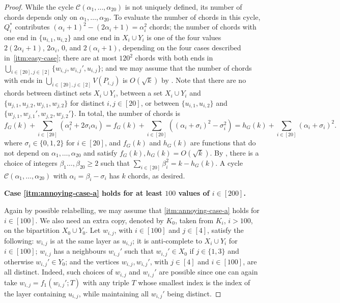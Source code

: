 \documentclass[11pt,english]{article}
\theoremstyle{plain}
\theoremstyle{definition}
\theoremstyle{remark}
\newcommand{\C}{\mathcal{C}}
\begin{document}
\begin{proof}
        While the cycle $\C(\alpha_1, \ldots, \alpha_{20})$ is not uniquely defined, its number of chords depends only on $\alpha_1, \ldots, \alpha_{20}$. 
        To evaluate the number of chords in this cycle, $Q_i^*$ contributes $(\alpha_i + 1)^2 - (2\alpha_i + 1) = \alpha_i^2$ chords; the number of chords with one end in $\{u_{i, 1}, u_{i, 2}\}$ and one end in $X_i \cup Y_i$ is one of the four values $2(2\alpha_i + 1)$, $2\alpha_i$, $0$, and $2(\alpha_i + 1)$, depending on the four cases described in~\ref{itm:easy-case}; there are at most $120^2$ chords with both ends in $\bigcup_{i \in [20], j \in [2]} \{w_{i, j}, w_{i, j}', u_{i, j}\}$; and we may assume that the number of chords with ends in $\bigcup_{i \in [20], j \in [2]} V(P_{i,j})$ is $O(\sqrt{k})$ by . Note that there are no chords between distinct sets $X_i \cup Y_i$, between a set $X_i \cup Y_i$ and $\{u_{j,1}, u_{j,2}, w_{j, 1}, w_{j, 2}\}$ for distinct $i, j \in [20]$, or between $\{u_{i,1}, u_{i, 2}\}$ and $\{w_{j, 1}, w_{j,1}', w_{j,2}, w_{j,2}'\}$.  In total, the number of chords is 
        \begin{equation*}
            f_G(k) + \sum_{i \in [20]} (\alpha_i^2 + 2\sigma_i \alpha_i) 
            = f_G(k) + \sum_{i \in [20]} \left((\alpha_i + \sigma_i)^2 - \sigma_i^2\right) 
            = h_G(k) + \sum_{i \in [20]} (\alpha_i + \sigma_i)^2.
        \end{equation*}
        where $\sigma_i \in \{0, 1, 2\}$ for $i \in [20]$, and $f_G(k)$ and $h_G(k)$ are functions that do not depend on $\alpha_1, \ldots, \alpha_{20}$ and satisfy $f_G(k), h_G(k) = O(\sqrt{k})$. By , there is a choice of integers $\beta_1 \ldots, \beta_{20} \ge 2$ such that $\sum_{i \in [20]} \beta_i^2 = k - h_G(k)$. A cycle $\C(\alpha_1, \ldots, \alpha_{20})$ with $\alpha_i = \beta_i - \sigma_i$ has $k$ chords, as desired.
        
        \medskip
        
        \textbf{Case \ref{itm:annoying-case-a} holds for at least $100$ values of $i \in [200]$.}
        
        Again by possible relabelling, we may assume that \ref{itm:annoying-case-a} holds for $i \in [100]$.
        We also need an extra copy, denoted by $K_0$, taken from $K_i$, $i>100$, on the bipartition $X_0\cup Y_0$.
        Let $w_{i, j}$, with $i \in [100]$ and $j \in [4]$, satisfy the following: $w_{i, j}$ is at the same layer as $u_{i, j}$; it is anti-complete to $X_i \cup Y_i$ for $i \in [100]$; $w_{i, j}$ has a neighbours $w_{i, j}'$ such that $w_{i, j}' \in X_0$ if $j \in \{1, 3\}$ and otherwise $w_{i, j}' \in Y_0$; and the vertices $w_{i, j}, w_{i, j}'$, with $j \in [4]$ and $i \in [100]$, are all distinct. 
        Indeed, such choices of $w_{i,j}$ and $w_{i,j}'$ are possible since one can again take $w_{i,j}=f_1(w_{i,j}';T)$ with any triple $T$ whose smallest index is the index of the layer containing $u_{i,j}$, while maintaining all $w_{i,j}'$ being distinct.
        

\end{proof}
\end{document}
